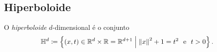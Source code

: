 \subsection{Hiperboloide}

\begin{defi}
O \emph{hiperboloide} $d$-dimensional é o conjunto
	\begin{equation*}
	\mathbb{H}^d \coloneqq \left\{(x,t) \in \mathbb{R}^d \times \mathbb{R} = \mathbb{R}^{d+1} \;\middle\vert\; \left\Vert{x}\right\Vert^2+1=t^2 \text{\ \ e\ \ } t>0 \right\}.
	\end{equation*}
\end{defi}


























